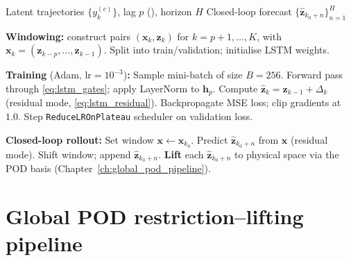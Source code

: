 \begin{algorithm}[H]
\caption{Latent LSTM ROM (): training and closed-loop rollout}
\label{alg:lstm_rom}
{\footnotesize
\begin{algorithmic}[1]
\Require Latent trajectories $\{y^{(c)}_k\}$, lag $p$ (), horizon $H$
\Ensure Closed-loop forecast $\{\widehat{\mathbf{z}}_{k_0+n}\}_{n=1}^{H}$

\State \textbf{Windowing:} construct pairs
  $(\mathbf{x}_k, \mathbf{z}_k)$ for $k=p{+}1,\ldots,K$,
  with $\mathbf{x}_k=(\mathbf{z}_{k-p},\ldots,\mathbf{z}_{k-1})$.
\State Split into train/validation; initialise LSTM weights.

\State \textbf{Training} (Adam, lr${}=10^{-3}$)\textbf{:}
  \State Sample mini-batch of size $B=256$.
  \State Forward pass through \eqref{eq:lstm_gates}; apply LayerNorm to $\mathbf{h}_p$.
  \State Compute $\widehat{\mathbf{z}}_k = \mathbf{z}_{k-1} + \Delta_k$ \quad (residual mode, \eqref{eq:lstm_residual}).
  \State Backpropagate MSE loss; clip gradients at $1.0$.
  \State Step \texttt{ReduceLROnPlateau} scheduler on validation loss.
\EndWhile

\State \textbf{Closed-loop rollout:}
\State Set window $\mathbf{x}\gets\mathbf{x}_{k_0}$.
  \State Predict $\widehat{\mathbf{z}}_{k_0+n}$ from $\mathbf{x}$ (residual mode).
  \State Shift window; append $\widehat{\mathbf{z}}_{k_0+n}$.
\EndFor
\State \textbf{Lift} each $\widehat{\mathbf{z}}_{k_0+n}$ to physical space
  via the POD basis (Chapter~\ref{ch:global_pod_pipeline}).
\end{algorithmic}
}
\end{algorithm}

\section{Global POD restriction--lifting pipeline}
\label{sec:app_pod_pipeline}

